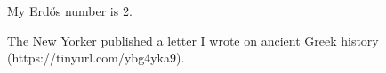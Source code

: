 
\begin{cventries}
\vspace{-6mm}
  \cventry
    {} %
    {} %
    {} %
    {} %
    {
      \begin{cvitems} %
        \item {My Erd\H{o}s number is 2.}
        \item {The New Yorker published a letter I wrote on ancient Greek history (https://tinyurl.com/ybg4yka9).}
      \end{cvitems}
    }

\end{cventries}
